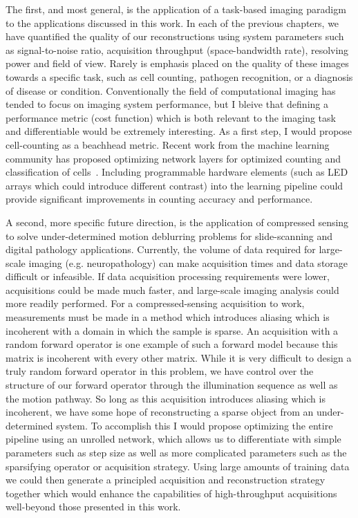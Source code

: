 The first, and most general, is the application of a task-based imaging paradigm to the applications discussed in this work. In each of the previous chapters, we have quantified the quality of our reconstructions using system parameters such as signal-to-noise ratio, acquisition throughput (space-bandwidth rate), resolving power and field of view. Rarely is emphasis placed on the quality of these images towards a specific task, such as cell counting, pathogen recognition, or a diagnosis of disease or condition. Conventionally the field of computational imaging has tended to focus on imaging system performance, but I bleive that defining a performance metric (cost function) which is both relevant to the imaging task and differentiable would be extremely interesting. As a first step, I would propose cell-counting as a beachhead metric. Recent work from the machine learning community has proposed optimizing network layers for optimized counting and classification of cells~\cite{falk2019unet, xue2017cell}. Including programmable hardware elements (such as LED arrays which could introduce different contrast) into the learning pipeline could provide significant improvements in counting accuracy and performance.

A second, more specific future direction, is the application of compressed sensing to solve under-determined motion deblurring problems for slide-scanning and digital pathology applications. Currently, the volume of data required for large-scale imaging (e.g. neuropathology) can make acquisition times and data storage difficult or infeasible. If data acquisition processing requirements were lower, acquisitions could be made much faster, and large-scale imaging analysis could more readily performed. For a compressed-sensing acquisition to work, measurements must be made in a method which introduces aliasing which is incoherent with a domain in which the sample is sparse. An acquisition with a random forward operator is one example of such a forward model because this matrix is incoherent with every other matrix. While it is very difficult to design a truly random forward operator in this problem, we have control over the structure of our forward operator through the illumination sequence as well as the motion pathway. So long as this acquisition introduces aliasing which is incoherent, we have some hope of reconstructing a sparse object from an under-determined system. To accomplish this I would propose optimizing the entire pipeline using an unrolled network, which allows us to differentiate with simple parameters such as step size as well as more complicated parameters such as the sparsifying operator or acquisition strategy. Using large amounts of training data we could then generate a principled acquisition and reconstruction strategy together which would enhance the capabilities of high-throughput acquisitions well-beyond those presented in this work.

